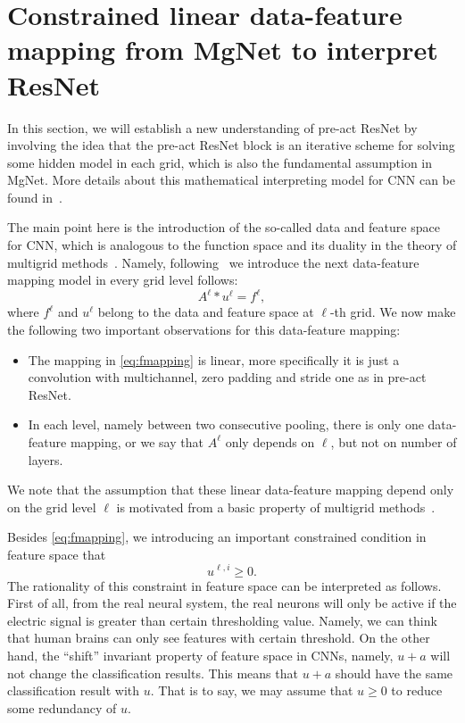 \section{Constrained linear data-feature mapping from MgNet to interpret ResNet}
In this section, we will establish a new understanding of pre-act ResNet  
by involving the idea that the pre-act ResNet block is an iterative scheme for solving some 
hidden model in each grid, which is also the fundamental assumption in MgNet. 
More details about this mathematical interpreting model for CNN can be found
in~\cite{he2019constrained}.

The main point here is the introduction of 
the so-called data and feature space for CNN, which is analogous to the 
function space and its duality in the theory of multigrid 
methods~\cite{xu2017algebraic}. 
Namely, following~\cite{he2019mgnet} we introduce 
the next data-feature mapping model in every grid level follows:
\begin{equation}\label{eq:fmapping}
A^{\ell} \ast u^\ell = f^{\ell},
\end{equation}
where $f^\ell$ and $u^\ell$ belong to the data and feature space at $\ell$-th grid. 
We now make the following two important observations for this data-feature mapping:
\begin{itemize}
	\item The mapping in \eqref{eq:fmapping} is linear, more specifically it is just a convolution with multichannel, zero
	padding and stride one as in pre-act ResNet.
	\item In each level, namely between two consecutive pooling, there is only one
	data-feature mapping, or we say that $A^\ell$ only depends on $\ell$, but not on number of layers.
\end{itemize}
We note that the assumption that these linear data-feature mapping
depend only on the grid level $\ell$ is motivated from a basic property of 
multigrid methods~\cite{xu1992iterative, hackbusch2013multi, xu2017algebraic}.

Besides \eqref{eq:fmapping}, we introducing an important constrained condition
in feature space that
\begin{equation}\label{eq:positive}
u^{\ell,i} \ge 0.
\end{equation}
The rationality of this constraint in feature space can be interpreted as follows.
First of all, from the real neural system, the real neurons will only be
active if the electric signal is greater than certain thresholding value. 
Namely, we can think that human brains can only see features 
with certain threshold.
On the other hand, the ``shift'' invariant property of feature space in CNNs,
namely, $u+a$ will not change the classification results. This means that $u+a$ should
have the same classification result with $u$. That is to say, we may assume that
$u \ge 0$ to reduce some redundancy of $u$.

